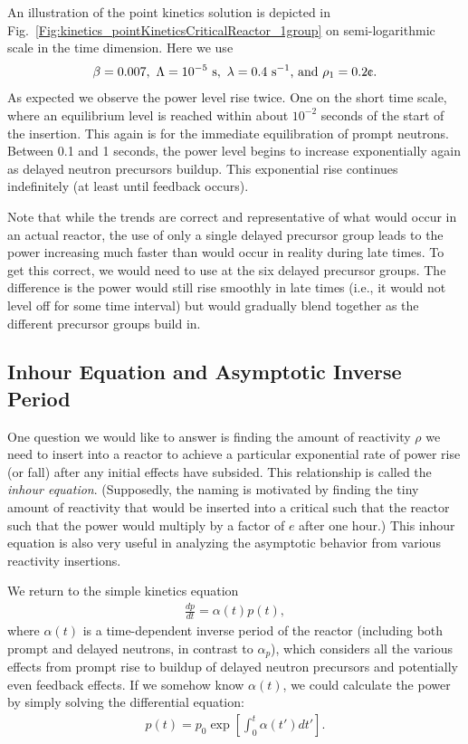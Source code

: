 An illustration of the point kinetics solution is depicted in Fig.~\ref{Fig:kinetics_pointKineticsCriticalReactor_1group} on semi-logarithmic scale in the time dimension. Here we use 
\begin{align}
  \beta = 0.007, \ \Lambda = 10^{-5} \text{ s}, \ \lambda = 0.4 \text{ s$^{-1}$, and } \rho_1 = 0.2\text{\textcent}. \nonumber
\end{align}
As expected we observe the power level rise twice. One on the short time scale, where an equilibrium level is reached within about $10^{-2}$ seconds of the start of the insertion. This again is for the immediate equilibration of prompt neutrons. Between 0.1 and 1 seconds, the power level begins to increase exponentially again as delayed neutron precursors buildup. This exponential rise continues indefinitely (at least until feedback occurs). 

Note that while the trends are correct and representative of what would occur in an actual reactor, the use of only a single delayed precursor group leads to the power increasing much faster than would occur in reality during late times. To get this correct, we would need to use at the six delayed precursor groups. The difference is the power would still rise smoothly in late times (i.e., it would not level off for some time interval) but would gradually blend together as the different precursor groups build in. 

\subsection{Inhour Equation and Asymptotic Inverse Period}

One question we would like to answer is finding the amount of reactivity $\rho$ we need to insert into a reactor to achieve a particular exponential rate of power rise (or fall) after any initial effects have subsided. This relationship is called the \emph{inhour equation}. (Supposedly, the naming is motivated by finding the tiny amount of reactivity that would be inserted into a critical such that the reactor such that the power would multiply by a factor of $e$ after one hour.) This inhour equation is also very useful in analyzing the asymptotic behavior from various reactivity insertions.

We return to the simple kinetics equation
\begin{align}
  \frac{dp}{dt} = \alpha(t) p(t),
\end{align}
where $\alpha(t)$ is a time-dependent inverse period of the reactor (including both prompt and delayed neutrons, in contrast to $\alpha_p$), which considers all the various effects from prompt rise to buildup of delayed neutron precursors and potentially even feedback effects. If we somehow know $\alpha(t)$, we could calculate the power by simply solving the differential equation:
\begin{align}
  p(t) = p_0 \exp\left[ \int_0^t \alpha(t') dt' \right] .
\end{align}

